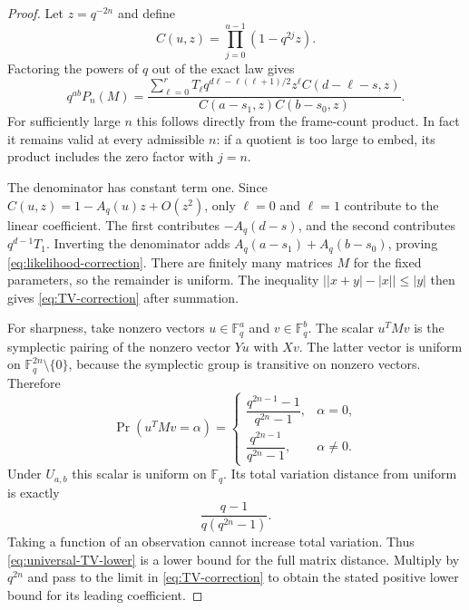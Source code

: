 \begin{proof}
Let $z=q^{-2n}$ and define
\[
 C(u,z)=\prod_{j=0}^{u-1}(1-q^{2j}z).
\]
Factoring the powers of $q$ out of the exact law gives
\begin{equation}
 q^{ab}P_n(M)=
 \frac{\displaystyle\sum_{\ell=0}^r
   T_\ell q^{d\ell-\ell(\ell+1)/2}z^\ell
   C(d-\ell-s,z)}
 {C(a-s_1,z)C(b-s_0,z)}.
 \label{eq:rational-likelihood}
\end{equation}
For sufficiently large $n$ this follows directly from the frame-count
product. In fact it remains valid at every admissible $n$: if a quotient
is too large to embed, its product includes the zero factor with $j=n$.

The denominator has constant term one. Since
$C(u,z)=1-A_q(u)z+O(z^2)$, only $\ell=0$ and $\ell=1$ contribute to
the linear coefficient. The first contributes $-A_q(d-s)$, and the
second contributes $q^{d-1}T_1$. Inverting the denominator adds
$A_q(a-s_1)+A_q(b-s_0)$, proving \eqref{eq:likelihood-correction}.
There are finitely many matrices $M$ for the fixed parameters, so the
remainder is uniform. The inequality $\bigl||x+y|-|x|\bigr|\leq|y|$
then gives \eqref{eq:TV-correction} after summation.

For sharpness, take nonzero vectors $u\in\mathbb F_q^a$ and
$v\in\mathbb F_q^b$. The scalar $u^TMv$ is the symplectic pairing of
the nonzero vector $Yu$ with $Xv$. The latter vector is uniform on
$\mathbb F_q^{2n}\setminus\{0\}$, because the symplectic group is
transitive on nonzero vectors. Therefore
\begin{equation}
 \Pr(u^TMv=\alpha)=
 \begin{cases}
 \dfrac{q^{2n-1}-1}{q^{2n}-1},&\alpha=0,\\[6pt]
 \dfrac{q^{2n-1}}{q^{2n}-1},&\alpha\ne0.
 \end{cases}
 \label{eq:scalar-pairing-law}
\end{equation}
Under $U_{a,b}$ this scalar is uniform on $\mathbb F_q$. Its total
variation distance from uniform is exactly
\begin{equation}
 \frac{q-1}{q(q^{2n}-1)}.
 \label{eq:universal-TV-lower}
\end{equation}
Taking a function of an observation cannot increase total variation.
Thus \eqref{eq:universal-TV-lower} is a lower bound for the full matrix
distance. Multiply by $q^{2n}$ and pass to the limit in
\eqref{eq:TV-correction} to obtain the stated positive lower bound
for its leading coefficient.
\end{proof}

